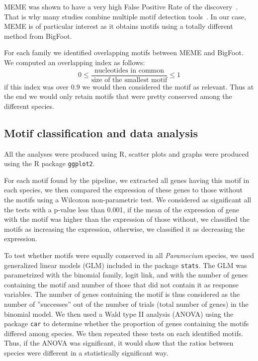 MEME was shown to have a very high False Positive Rate of the discovery~\citep{zia_towards_2012}. That is why many studies combine multiple motif detection tools~\citep{liseron-monfils_promzea:_2013}. In our case, MEME is of particular interest as it obtains motifs using a totally different method from BigFoot.

For each family we identified overlapping motifs between MEME and BigFoot. We computed an overlapping index as follows: 
\begin{equation}
0 \leq \frac{\text{nucleotides in common}}{\text{size of the smallest motif}} \leq 1
\end{equation}
if this index was over $0.9$ we would then considered the motif as relevant. Thus at the end we would only retain motifs that were pretty conserved among the different species.

\subsection*{Motif classification and data analysis}

All the analyses were produced using R, scatter plots and graphs were produced using the R package \texttt{ggplot2}.

For each motif found by the pipeline, we extracted all genes having this motif in each species, we then compared the expression of these genes to those without the motifs using a Wilcoxon non-parametric test. We considered as significant all the tests with a p-value less than 0.001, if the mean of the expression of gene with the motif was higher than the expression of those without, we classified the motifs as increasing the expression, otherwise, we classified it as decreasing the expression.

To test whether motifs were equally conserved in all \textit{Paramecium} species, we used generalized linear models (GLM) included in the package \texttt{stats}. The GLM was parametrized with the binomial family, logit link, and with the number of genes containing the motif and number of those that did not contain it as response variables. The number of genes containing the motif is thus considered as the number of ''successes'' out of the number of trials (total number of genes) in the binomial model. We then used a Wald type II analysis (ANOVA) using the package \texttt{car} to determine whether the proportion of genes containing the motifs differed among species. We then repeated these tests on each identified motifs. Thus, if the ANOVA was significant, it would show that the ratios between species were different in a statistically significant way.

